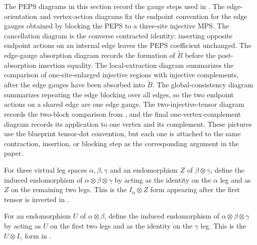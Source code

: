 \begin{remark}
    The PEPS diagrams in this section record the gauge steps used in
    \cite[Section~3]{Molnar2018NormalPEPS}. The edge-orientation and
    vertex-action diagrams fix the endpoint convention for the edge gauges
    obtained by blocking the PEPS to a three-site injective MPS. The
    cancellation diagram is the converse contracted identity: inserting
    opposite endpoint actions on an internal edge leaves the PEPS coefficient
    unchanged. The edge-gauge absorption diagram records the formation of
    $\widetilde B$ before the post-absorption insertion equality. The
    local-extraction diagram summarizes the comparison of
    one-site-enlarged injective regions with injective complements, after the
    edge gauges have been absorbed into $\tilde{B}$. The global-consistency
    diagram summarizes repeating the edge blocking over all edges, so the two
    endpoint actions on a shared edge are one edge gauge. The
    two-injective-tensor diagram records the two-block comparison from
    \cite[Section~3]{Molnar2018NormalPEPS}, and the final
    one-vertex-complement diagram records its application to one vertex and its
    complement. These pictures use the
    blueprint tensor-dot convention, but each one is attached to the same
    contraction, insertion, or blocking step as the corresponding argument in
    the paper.
\end{remark}

\begin{definition}%
    \label{def:peps_threeLegLeftIdentityForm}
    \leanok
    For three virtual leg spaces $\alpha,\beta,\gamma$ and an endomorphism
    $Z$ of $\beta\otimes\gamma$, define the induced endomorphism of
    $\alpha\otimes\beta\otimes\gamma$ by acting as the identity on the
    $\alpha$ leg and as $Z$ on the remaining two legs. This is the
    $I_\alpha\otimes Z$ form appearing after the first tensor is inverted in
    \cite[Section~3]{Molnar2018NormalPEPS}.
\end{definition}

\begin{definition}%
    \label{def:peps_threeLegRightIdentityForm}
    \leanok
    For an endomorphism $U$ of $\alpha\otimes\beta$, define the induced
    endomorphism of $\alpha\otimes\beta\otimes\gamma$ by acting as $U$ on the
    first two legs and as the identity on the $\gamma$ leg. This is the
    $U\otimes I_\gamma$ form in \cite[Section~3]{Molnar2018NormalPEPS}.
\end{definition}


